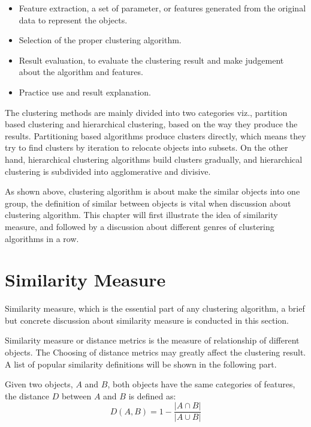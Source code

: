 \documentclass[utf8,english]{gradu3}
\begin{document}
\begin{itemize}
	\item Feature extraction, a set of parameter, or features generated from the original data to represent the objects.
	\item Selection of the proper clustering algorithm.
	\item Result evaluation, to evaluate the clustering result and make judgement about the algorithm and features.
	\item Practice use and result explanation.
\end{itemize}

The clustering methods are mainly divided into two categories viz., partition based clustering and hierarchical clustering, based on the way they produce the results. Partitioning based algorithms produce clusters directly, which means they try to find clusters by iteration to relocate objects into subsets. On the other hand, hierarchical clustering algorithms build clusters gradually, and hierarchical clustering is subdivided into agglomerative and divisive.

As shown above, clustering algorithm is about make the similar objects into one group, the definition of similar between objects is vital when discussion about clustering algorithm. This chapter will first illustrate the idea of similarity measure, and followed by a discussion about different genres of clustering algorithms in a row.


\section{Similarity Measure}

Similarity measure, which is the essential part of any clustering algorithm, a brief but concrete discussion about similarity measure is conducted in this section.

Similarity measure or distance metrics is the measure of relationship of different objects. The Choosing of distance metrics may greatly affect the clustering result. A list of popular similarity definitions will be shown in the following part.

\begin{definition}
	\label{def:jaccard_distance}
	Given two objects, $A$ and $B$, both objects have the same categories of features, the distance $D$ between $A$ and $B$ is defined as:
	\[
	D\left(A,B\right) = 1 - 
	\frac{
		\lvert A \cap B \lvert
	}{
		\lvert A \cup B \lvert
	}
\]
\end{definition}
\end{document}
